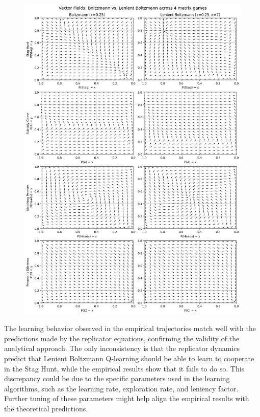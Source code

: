 \begin{figure}
    \includegraphics[width=\linewidth]{figures/task-2/replicator_dynamics.png}
\end{figure}

The learning behavior observed in the empirical trajectories match well with the predictions made by the replicator equations, confirming the validity of the analytical approach. The only inconsistency is that the replicator dynamics predict that Lenient Boltzmann Q-learning should be able to learn to cooperate in the Stag Hunt, while the empirical results show that it fails to do so. This discrepancy could be due to the specific parameters used in the learning algorithms, such as the learning rate, exploration rate, and leniency factor. Further tuning of these parameters might help align the empirical results with the theoretical predictions.

